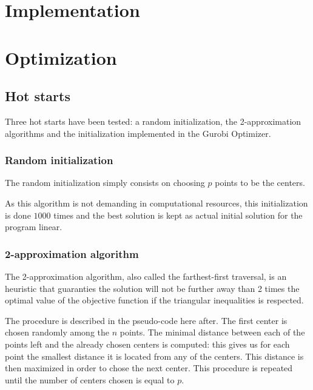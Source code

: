 \documentclass[a4paper,10pt]{article}
\begin{document}

\section{Implementation}

\section{Optimization}
\subsection{Hot starts}
Three hot starts have been tested: a random initialization, the 2-approximation algorithms and the initialization implemented in the Gurobi Optimizer.

\subsubsection{Random initialization}

The random initialization simply consists on choosing $p$ points to be the centers.

As this algorithm is not demanding in computational resources, this initialization is done $1000$ times and the best solution is kept as actual initial solution for the program linear.

\subsubsection{2-approximation algorithm}

The 2-approximation algorithm, also called the farthest-first traversal, is an heuristic that guaranties the solution will not be further away than 2 times the optimal value of the objective function if the triangular inequalities is respected. 

The procedure is described in the pseudo-code here after. The first center is chosen randomly among the $n$ points. The minimal distance between each of the points left and the already chosen centers is computed: this gives us for each point the smallest distance it is located from any of the centers. This distance is then maximized in order to chose the next center. This procedure is repeated until the number of centers chosen is equal to $p$.
\end{document}
